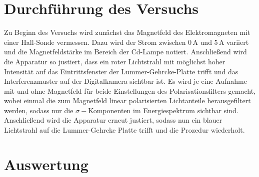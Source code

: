 \section{Durchführung des Versuchs}
Zu Beginn des Versuchs wird zunächst das Magnetfeld des Elektromagneten mit einer Hall-Sonde vermessen. Dazu wird der Strom zwischen $0\,\si{\A}$ und $5\,\si{\A}$ variiert und die Magnetfeldstärke im Bereich der
Cd-Lampe notiert.
Anschließend wird die Apparatur so justiert, dass ein roter Lichtstrahl mit möglichst hoher Intensität auf das Eintrittsfenster der Lummer-Gehrcke-Platte trifft und das Interferenzmuster auf der Digitalkamera sichtbar ist.
Es wird je eine Aufnahme mit und ohne Magnetfeld für beide Einstellungen des Polarisationsfilters gemacht, wobei einmal die zum Magnetfeld linear polarisierten Lichtanteile herausgefiltert werden, sodass nur die $\sigma-$Komponenten
im Energiespektrum sichtbar sind.
Anschließend wird die Apparatur erneut justiert, sodass nun ein blauer Lichtstrahl auf die Lummer-Gehrcke Platte trifft und die Prozedur wiederholt.

\section{Auswertung}
